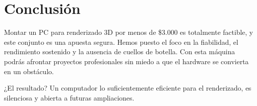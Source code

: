 \documentclass[12pt,a4paper]{article}
\begin{document}
	\clearpage
	
	\section*{Conclusión}
	Montar un PC para renderizado 3D por menos de \$3.000 es totalmente factible, y este conjunto es una apuesta segura. Hemos puesto el foco en la fiabilidad, el rendimiento sostenido y la ausencia de cuellos de botella. Con esta máquina podrás afrontar proyectos profesionales sin miedo a que el hardware se convierta en un obstáculo.
	
	¿El resultado? Un computador lo suficientemente eficiente para el renderizado, es silenciosa y abierta a futuras ampliaciones.
	
\end{document}
